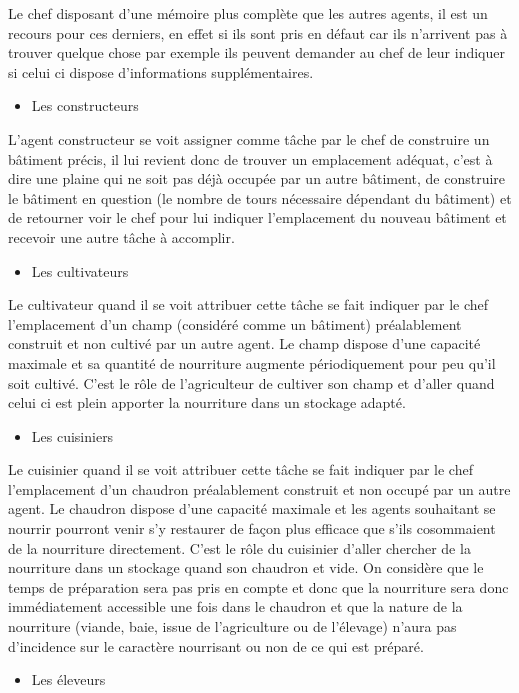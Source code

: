 \documentclass[12pt]{article}
\begin{document}
Le chef disposant d'une mémoire plus complète que les autres agents, il est un 
recours pour ces derniers, en effet si ils sont pris en défaut car ils 
n'arrivent pas à trouver quelque chose par exemple ils peuvent demander au 
chef de leur indiquer si celui ci dispose d'informations supplémentaires.\\

		\begin{itemize}
		\item Les constructeurs\\
		\end{itemize}

L'agent constructeur se voit assigner comme tâche par le chef de construire un 
bâtiment précis, il lui revient donc de trouver un emplacement adéquat, c'est à
dire une plaine qui ne soit pas déjà occupée par un autre bâtiment, de 
construire le bâtiment en question (le nombre de tours nécessaire dépendant du 
bâtiment) et de retourner voir le chef pour lui indiquer l'emplacement du 
nouveau bâtiment et recevoir une autre tâche à accomplir.\\

		\begin{itemize}
		\item Les cultivateurs\\
		\end{itemize}

Le cultivateur quand il se voit attribuer cette tâche se fait indiquer par le 
chef l'emplacement d'un champ (considéré comme un bâtiment) préalablement 
construit et non cultivé par un autre agent. Le champ dispose d'une capacité 
maximale et sa quantité de nourriture augmente périodiquement pour peu qu'il 
soit cultivé. C'est le rôle de l'agriculteur de cultiver son champ et d'aller 
quand celui ci est plein apporter la nourriture dans un stockage adapté.\\

		\begin{itemize}
		\item Les cuisiniers\\
		\end{itemize}

Le cuisinier quand il se voit attribuer cette tâche se fait indiquer par le 
chef l'emplacement d'un chaudron préalablement construit et non occupé par 
un autre agent. Le chaudron dispose d'une capacité maximale et les agents 
souhaitant se nourrir pourront venir s'y restaurer de façon plus efficace que 
s'ils cosommaient de la nourriture directement. C'est le rôle du cuisinier 
d'aller chercher de la nourriture dans un stockage quand son chaudron et vide.
On considère que le temps de préparation sera pas pris en compte et donc que 
la nourriture sera donc immédiatement accessible une fois dans le chaudron et 
que la nature de la nourriture (viande, baie, issue de l'agriculture ou de 
l'élevage) n'aura pas d'incidence sur le caractère nourrisant ou non de ce qui 
est préparé.\\

		\begin{itemize}
		\item Les éleveurs\\
		\end{itemize}
\end{document}
